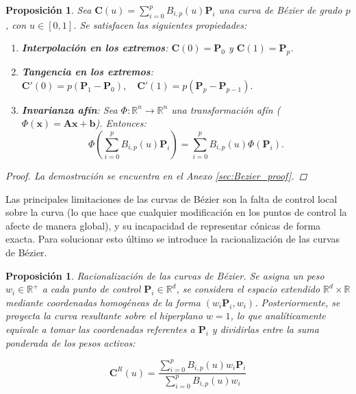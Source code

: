 \documentclass[11pt]{book}
\theoremstyle{plain} %
\newtheorem{proposicion}[teorema]{Proposición}
\theoremstyle{definition} %
\theoremstyle{definition} %
\newcommand\R{\mathbb{R}}
\begin{document}
\begin{proposicion}
    Sea $\mathbf{C}(u) = \sum_{i=0}^{p} B_{i,p}(u)\mathbf{P}_i$ una curva de Bézier de grado $p$, con $u \in [0,1]$. Se satisfacen las siguientes propiedades:

    \begin{enumerate}
        \item \textbf{Interpolación en los extremos}:
         $\mathbf{C}(0) = \mathbf{P}_0$ y $\mathbf{C}(1) = \mathbf{P}_p$.
        \item \textbf{Tangencia en los extremos}: $\mathbf{C}'(0) = p(\mathbf{P}_1 - \mathbf{P}_0), \quad \mathbf{C}'(1) = p(\mathbf{P}_p - \mathbf{P}_{p-1}).$
        
        
        \item \textbf{Invarianza afín}:
        Sea $\Phi: \mathbb{R}^n \to \mathbb{R}^n$ una transformación afín ( $\Phi(\mathbf{x}) = \mathbf{A}\mathbf{x} + \mathbf{b}$). Entonces:
        \begin{equation*}
            \Phi\left( \sum_{i=0}^{p} B_{i,p}(u)\mathbf{P}_i \right) = \sum_{i=0}^{p} B_{i,p}(u)\Phi(\mathbf{P}_i).
        \end{equation*}
    \end{enumerate}
    \begin{proof}
        La demostración se encuentra en el Anexo \ref{sec:Bezier_proof}.
    \end{proof}
\end{proposicion}

Las principales limitaciones de las curvas de Bézier son la falta de control local sobre la curva (lo que hace que cualquier
modificación en los puntos de control la afecte de manera global),
y su incapacidad de representar cónicas de forma exacta. Para solucionar esto último
se introduce la racionalización de las curvas de Bézier.

\begin{proposicion}\label{prop:raz_Bezier}
    Racionalización de las curvas de Bézier.
    Se asigna un peso $w_i \in \mathbb{R}^+$ a cada punto de control $\mathbf{P}_i \in \R^d$, se considera el espacio extendido
    $\mathbb{R}^d \times \mathbb{R}$ mediante coordenadas homogéneas de la forma $(w_i \mathbf{P}_i, w_i)$.
    Posteriormente, se proyecta la curva resultante sobre el hiperplano $w=1$, lo que analíticamente equivale
    a tomar las coordenadas referentes a $\mathbf{P}_i$ y dividirlas entre la suma ponderada de los pesos activos:    
    
    \vspace{-0.35cm}%

    \begin{equation*}
        \mathbf{C}^R(u) = \frac{\sum_{i=0}^{p} B_{i,p}(u) w_i \mathbf{P}_i}{\sum_{i=0}^{p} B_{i,p}(u) w_i}
    \end{equation*}
    \vspace{0.15cm}%
\end{proposicion}
\end{document}
